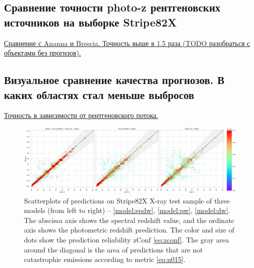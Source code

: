 \documentclass[fleqn,usenatbib]{mnras}
\begin{document}
\clearpage

\subsection{Сравнение точности photo-z рентгеновских источников на выборке Stripe82X}\label{ssec:sota-comp}

\underline{Сравнение с Ananna и Brescia. Точность выше в 1.5 раза (TODO разобраться с объектами без прогнзов).}

\subsection{Визуальное сравнение качества прогнозов. В каких областях стал меньше выбросов}

\underline{Точность в зависимости от рентгеновского потока.}

\begin{figure}
    \centering
    \includegraphics[width=0.99\linewidth]{images/scatterplots-stripe82x-sorted.png}
    \caption{Scatterplots of predictions on Stripe82X X-ray test sample of three models (from left to right) -- \ref{model:spdw}, \ref{model:pw}, \ref{model:dw}. The abscissa axis shows the spectral redshift value, and the ordinate axis shows the photometric redshift prediction. The color and size of dots show the prediction reliability zConf \eqref{eq:zconf}. The gray area around the diagonal is the area of predictions that are not catastrophic emissions according to metric \eqref{eq:n015}.}
    \label{fig:scatter-s82x}
\end{figure}
\end{document}
